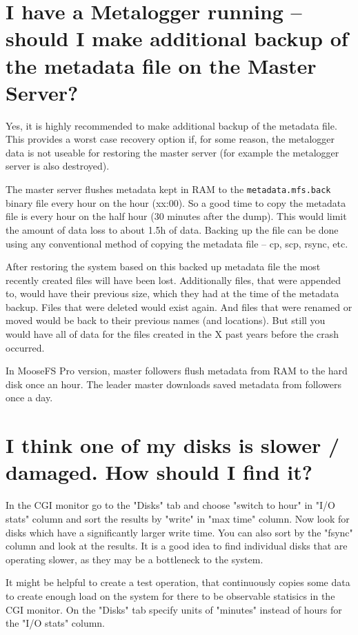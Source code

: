 \documentclass[a4paper,11pt,english]{report}
\def\code#1{\texttt{#1}}
\begin{document}
		\section{I have a Metalogger running -- should I make additional backup of the metadata file on the Master Server?}
		Yes, it is highly recommended to make additional backup of the metadata file. This provides a worst case recovery option if, for some reason, the metalogger data is not useable for restoring the master server (for example the metalogger server is also destroyed).
		
		The master server flushes metadata kept in RAM to the \code{metadata.mfs.back} binary file every hour on the hour (xx:00). So a good time to copy the metadata file is every hour on the half hour (30 minutes after the dump). This would limit the amount of data loss to about 1.5h of data. Backing up the file can be done using any conventional method of copying the metadata file -- cp, scp, rsync, etc.
		
		After restoring the system based on this backed up metadata file the most recently created files will have been lost. Additionally files, that were appended to, would have their previous size, which they had at the time of the metadata backup. Files that were deleted would exist again. And files that were renamed or moved would be back to their previous names (and locations). But still you would have all of data for the files created in the X past years before the crash occurred.
		
		In MooseFS Pro version, master followers flush metadata from RAM to the hard disk once an hour. The leader master downloads saved metadata from followers once a day.
		 
		 
		\section{I think one of my disks is slower / damaged. How should I find it?}
		In the CGI monitor go to the "Disks" tab and choose "switch to hour" in "I/O stats" column and sort the results by "write" in "max time" column. Now look for disks which have a significantly larger write time. You can also sort by the "fsync" column and look at the results. It is a good idea to find individual disks that are operating slower, as they may be a bottleneck to the system.
		
		It might be helpful to create a test operation, that continuously copies some data to create enough load on the system for there to be observable statisics in the CGI monitor. On the "Disks" tab specify units of "minutes" instead of hours for the "I/O stats" column.
		
\end{document}
